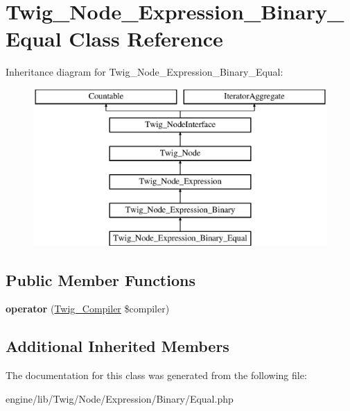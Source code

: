 \hypertarget{class_twig___node___expression___binary___equal}{}\section{Twig\+\_\+\+Node\+\_\+\+Expression\+\_\+\+Binary\+\_\+\+Equal Class Reference}
\label{class_twig___node___expression___binary___equal}
Inheritance diagram for Twig\+\_\+\+Node\+\_\+\+Expression\+\_\+\+Binary\+\_\+\+Equal\+:\begin{figure}[H]
\begin{center}
\leavevmode
\includegraphics[height=6.000000cm]{class_twig___node___expression___binary___equal}
\end{center}
\end{figure}
\subsection*{Public Member Functions}
\begin{DoxyCompactItemize}
\item 
\hypertarget{class_twig___node___expression___binary___equal_af77318ec88d5f8a508684970a150b670}{}{\bfseries operator} (\hyperlink{class_twig___compiler}{Twig\+\_\+\+Compiler} \$compiler)\label{class_twig___node___expression___binary___equal_af77318ec88d5f8a508684970a150b670}

\end{DoxyCompactItemize}
\subsection*{Additional Inherited Members}


The documentation for this class was generated from the following file\+:\begin{DoxyCompactItemize}
\item 
engine/lib/\+Twig/\+Node/\+Expression/\+Binary/Equal.\+php\end{DoxyCompactItemize}
